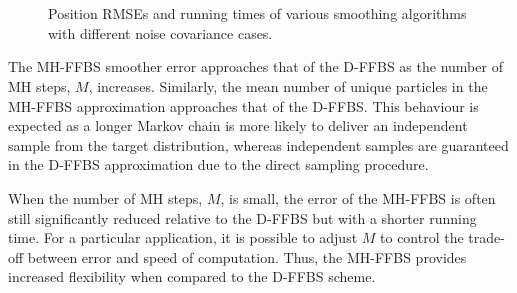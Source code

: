 \documentclass[peerreview,11pt,draftcls,onecolumn]{IEEEtran}
\begin{document}
\begin{figure}[!t]
\centering
{}
\\
\\
\caption{Position RMSEs and running times of various smoothing algorithms with different noise covariance cases.}%
\label{fig:rmse_vs_time}%
\end{figure}

The MH-FFBS smoother error approaches that of the D-FFBS as the number of MH steps, $M$, increases. Similarly, the mean number of unique particles in the MH-FFBS approximation approaches that of the D-FFBS. This behaviour is expected as a longer Markov chain is more likely to deliver an independent sample from the target distribution, whereas independent samples are guaranteed in the D-FFBS approximation due to the direct sampling procedure.

When the number of MH steps, $M$, is small, the error of the MH-FFBS is often still significantly reduced relative to the D-FFBS but with a shorter running time. For a particular application, it is possible to adjust $M$ to control the trade-off between error and speed of computation. Thus, the MH-FFBS provides increased flexibility when compared to the D-FFBS scheme.
\end{document}
